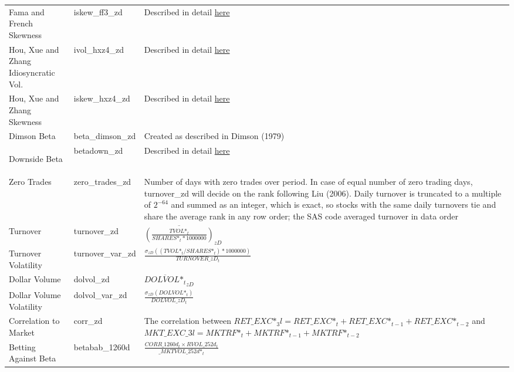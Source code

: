 \documentclass[12pt,title,fleqn]{article}
\begin{document}
{\begin{longtable}{@{\extracolsep{\fill}}|m{5cm}|l|m{8cm}|@{}}
    Fama and French Skewness & iskew\_ff3\_zd & Described in detail \hyperlink{factors}{here} \\   
    
    Hou, Xue and Zhang Idiosyncratic Vol. & ivol\_hxz4\_zd & Described in detail \hyperlink{factors}{here}\\ 
     
    Hou, Xue and Zhang Skewness & iskew\_hxz4\_zd & Described in detail \hyperlink{factors}{here} \\    
    
    Dimson Beta & beta\_dimson\_zd & Created as described in Dimson (1979) \\
    
    \hypertarget{dbeta2}{Downside Beta} & betadown\_zd & Described in detail \hyperlink{dbeta}{here} \\
    
	Zero Trades & zero\_trades\_zd & Number of days with zero trades over period. In case of equal number of zero trading days, turnover\_zd will decide on the rank following Liu (2006). Daily turnover is truncated to a multiple of $2^{-64}$ and summed as an integer, which is exact, so stocks with the same daily turnovers tie and share the average rank in any row order; the SAS code averaged turnover in data order \\
    
    Turnover & turnover\_zd &$\overline{\left(\frac{TVOL\mbox{*}_t}{SHARES\mbox{*}_t*1000000}\right)}_{zD}$\\
    
    Turnover Volatility & turnover\_var\_zd & $\frac{\sigma_{zD}\left((TVOL\mbox{*}_t/SHARES\mbox{*}_t)*1000000\right)}{TURNOVER\_zD_t}$\\
    
    Dollar Volume & dolvol\_zd &$\overline{DOLVOL\mbox{*}_t}_{zD}$\\
    
    Dollar Volume Volatility & dolvol\_var\_zd & $\frac{\sigma_{zD}(DOLVOL\mbox{*}_t)}{DOLVOL\_zD_t}$ \\
    
    Correlation to Market & corr\_zd & The correlation between $RET\_EXC\mbox{*}_3l = RET\_EXC\mbox{*}_t + RET\_EXC\mbox{*}_{t-1} + RET\_EXC\mbox{*}_{t-2}$ and $MKT\_EXC\_3l = MKTRF\mbox{*}_t + MKTRF\mbox{*}_{t-1} + MKTRF\mbox{*}_{t-2}$ \\
    
    Betting Against Beta & betabab\_1260d & $\frac{CORR\_1260d_t \times RVOL\_252d_t}{\_MKTVOL\_252d\mbox{*}_t}$ \\
    

\end{longtable}}
\end{document}
